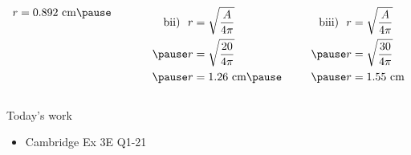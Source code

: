 \documentclass[aspectratio=169,10pt]{beamer}
\begin{document}
\begin{frame}
\begin{solution}[]
\begin{columns}[t]
\begin{column}{.2\textwidth}
\[\begin{aligned}
          r&=0.892\text{ cm}\pause
        \end{aligned}
        \]
      \end{column}
      \begin{column}{.2\textwidth}
        \vspace{-2em}
        \[
        \begin{aligned}
          \text{bii) }\  r&=\sqrt{\frac{A}{4\pi}}\\\pause
          r&=\sqrt{\frac{20}{4\pi}}\\\pause
          r&=1.26\text{ cm}\pause
        \end{aligned}
        \]
      \end{column}
      \begin{column}{.2\textwidth}
        \vspace{-2em}
        \[
        \begin{aligned}
          \text{biii) }\  r&=\sqrt{\frac{A}{4\pi}}\\\pause
          r&=\sqrt{\frac{30}{4\pi}}\\\pause
          r&=1.55\text{ cm}
        \end{aligned}
        \]
      \end{column}
    \end{columns}
  \end{solution}
\end{frame}

\begin{frame}{Today's work}
  \begin{itemize} 
    \item Cambridge Ex 3E Q1-21
  \end{itemize}
\end{frame}
\end{document}
